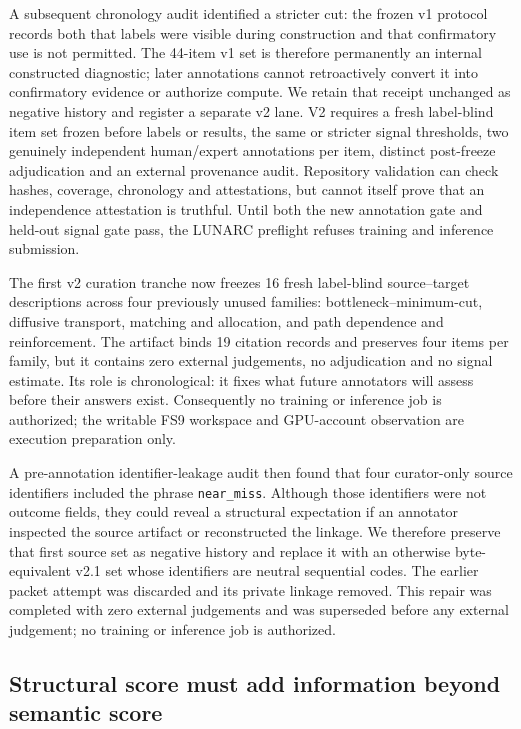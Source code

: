A subsequent chronology audit identified a stricter cut: the frozen v1 protocol records both that labels were visible during construction and that confirmatory use is not permitted.  The 44-item v1 set is therefore permanently an internal constructed diagnostic; later annotations cannot retroactively convert it into confirmatory evidence or authorize compute.  We retain that receipt unchanged as negative history and register a separate v2 lane.  V2 requires a fresh label-blind item set frozen before labels or results, the same or stricter signal thresholds, two genuinely independent human/expert annotations per item, distinct post-freeze adjudication and an external provenance audit.  Repository validation can check hashes, coverage, chronology and attestations, but cannot itself prove that an independence attestation is truthful.  Until both the new annotation gate and held-out signal gate pass, the LUNARC preflight refuses training and inference submission.

The first v2 curation tranche now freezes 16 fresh label-blind source--target descriptions across four previously unused families: bottleneck--minimum-cut, diffusive transport, matching and allocation, and path dependence and reinforcement.  The artifact binds 19 citation records and preserves four items per family, but it contains zero external judgements, no adjudication and no signal estimate.  Its role is chronological: it fixes what future annotators will assess before their answers exist.  Consequently no training or inference job is authorized; the writable FS9 workspace and GPU-account observation are execution preparation only.

A pre-annotation identifier-leakage audit then found that four curator-only source identifiers included the phrase \texttt{near\_miss}.  Although those identifiers were not outcome fields, they could reveal a structural expectation if an annotator inspected the source artifact or reconstructed the linkage.  We therefore preserve that first source set as negative history and replace it with an otherwise byte-equivalent v2.1 set whose identifiers are neutral sequential codes.  The earlier packet attempt was discarded and its private linkage removed.  This repair was completed with zero external judgements and was superseded before any external judgement; no training or inference job is authorized.

\subsection{Structural score must add information beyond semantic score}

